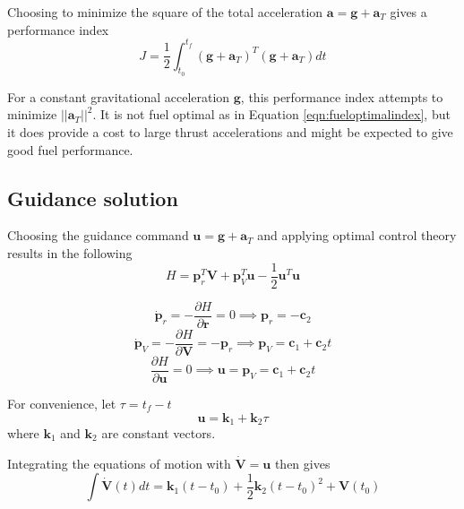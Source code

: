 Choosing to minimize the square of the total acceleration $\boldsymbol{a} = \boldsymbol{g} + \boldsymbol{a}_T$ gives a performance index
\begin{equation}
\label{eqn:performanceindex}
J = \frac{1}{2} \int_{t_0}^{t_f} (\boldsymbol{g}+\boldsymbol{a}_T)^T(\boldsymbol{g}+\boldsymbol{a}_T)dt
\end{equation}

For a constant gravitational acceleration $\boldsymbol{g}$, this performance index attempts to minimize $||\boldsymbol{a}_T||^2$. It is not fuel optimal as in Equation \ref{eqn:fueloptimalindex}, but it does provide a cost to large thrust accelerations and might be expected to give good fuel performance.

\subsection{Guidance solution}
Choosing the guidance command $\boldsymbol{u} = \boldsymbol{g} + \boldsymbol{a}_T$ and applying optimal control theory results in the following
\begin{equation}
\label{eqn:Hamiltonian}
H = \boldsymbol{p}_r^T\boldsymbol{V} + \boldsymbol{p}_V^T\boldsymbol{u} - \frac{1}{2}\boldsymbol{u}^T\boldsymbol{u}
\end{equation}

\begin{equation*}
\dot{\boldsymbol{p}}_r = -\frac{\partial H}{\partial \boldsymbol{r}} = 0 \implies \boldsymbol{p}_r = -\boldsymbol{c}_2
\end{equation*}
\begin{equation*}
\dot{\boldsymbol{p}}_V = -\frac{\partial H}{\partial \boldsymbol{V}} = -\boldsymbol{p}_r \implies \boldsymbol{p}_V = \boldsymbol{c}_1 + \boldsymbol{c}_2 t
\end{equation*}
\begin{equation*}
\frac{\partial H}{\partial \boldsymbol{u}} = 0 \implies \boldsymbol{u} = \boldsymbol{p}_V = \boldsymbol{c}_1 + \boldsymbol{c}_2 t
\end{equation*}

For convenience, let $\tau = t_f - t$
\begin{equation}
\label{eqn:command}
\boldsymbol{u} = \boldsymbol{k}_1 + \boldsymbol{k}_2 \tau
\end{equation}
where $\boldsymbol{k}_1$ and $\boldsymbol{k}_2$ are constant vectors.

Integrating the equations of motion with $\boldsymbol{\dot{V}} = \boldsymbol{u}$ then gives
\begin{equation}
\label{eqn:EoM_solve_1}
\int\boldsymbol{\dot{V}}(t) dt  = \boldsymbol{k}_1(t-t_0) + \frac{1}{2}\boldsymbol{k}_2(t-t_0)^2 + \boldsymbol{V}(t_0) 
\end{equation}

